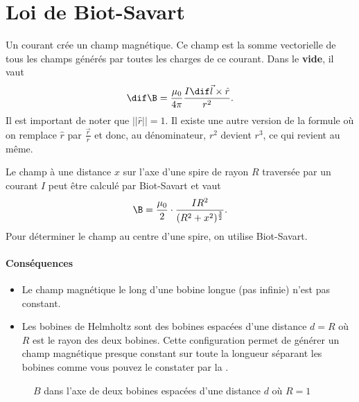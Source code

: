 \section{Loi de Biot-Savart}
\label{sec:bs}
Un courant crée un champ magnétique.
Ce champ est la somme vectorielle de tous les champs
générés par toutes les charges de ce courant.
Dans le \textbf{vide}, il vaut
\[ \dif\B = \frac{\mu_0}{4\pi}\frac{I\dif \vec l\times \hat r}{r^2}. \]
Il est important de noter que $||\hat r|| = 1$.
Il existe une autre version de la formule où on remplace $\hat r$ par
$\frac{\vec r}{r}$ et donc, au dénominateur,
$r^2$ devient $r^3$, ce qui revient au même.

Le champ à une distance $x$ sur l'axe d'une spire de rayon
$R$ traversée par un courant $I$ peut être calculé par Biot-Savart et vaut
\[ \B = \frac{\mu_0}{2}\cdot\frac{IR^2}{(R^2 + x^2)^{\frac{3}{2}}}. \]
Pour déterminer le champ au centre d'une spire, on utilise Biot-Savart.

\paragraph{Conséquences}
\begin{itemize}
  \item Le champ magnétique le long d'une bobine longue
    (pas infinie) n'est pas constant.
  \item Les bobines de Helmholtz sont des bobines espacées
    d'une distance $d = R$ où $R$ est le rayon des deux bobines.
    Cette configuration permet de générer un champ magnétique presque constant
    sur toute la longueur séparant les bobines
    comme vous pouvez le constater par la .
\end{itemize}
\begin{figure}
  \begin{center}
  \end{center}
  \caption{$B$ dans l'axe de deux bobines espacées d'une distance $d$ où $R=1$}
  \label{fig:deqr}
\end{figure}

